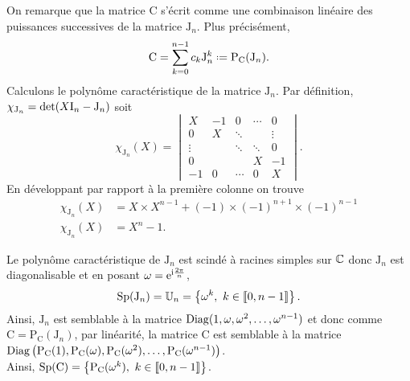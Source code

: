 \begin{preuve}
    On remarque que la matrice $\mathrm{C}$ s'écrit comme une combinaison linéaire des puissances successives de la matrice $\mathrm{J}_n$. Plus précisément, 
    $$\mathrm{C} = \sum_{k=0}^{n-1} c_k \mathrm{J}_n^k \defeq \mathrm{P}_{\mathrm{C}}(\mathrm{J}_n).$$
    Calculons le polynôme caractéristique de la matrice $\mathrm{J}_n$. Par définition, $\chi_{\mathrm{J}_n} = \det(X \mathrm{I}_n - \mathrm{J}_n)$ soit 
    $$
        \chi_{\mathrm{J}_n}(X) = 
        \begin{vmatrix}
        X & -1 & 0 & \cdots & 0 \\
        0 & X & \ddots & & \vdots \\
        \vdots & & \ddots & \ddots & 0 \\
        0 & & & X & -1 \\
        -1 & 0 & \cdots & 0 & X
        \end{vmatrix}.
    $$
    En développant par rapport à la première colonne on trouve
    \begin{align*}
        \chi_{\mathrm{J}_n}(X) &= X \times X^{n-1} + (-1) \times (-1)^{n+1} \times (-1)^{n-1} \\
        \chi_{\mathrm{J}_n}(X) &= X^n-1.
    \end{align*}
    
    Le polynôme caractéristique de $\mathrm{J}_n$ est scindé à racines simples sur $\mathbb{C}$ donc $\mathrm{J}_n$ est diagonalisable et en posant $\omega = \mathrm{e}^{\mathrm{i} \frac{2 \pi}{n}}$, 
    $$\mathrm{Sp}(\mathrm{J}_n) = \mathbb{U}_n = \left \{ \omega^k,\ k \in \llbracket 0, n-1 \rrbracket \right \}.$$
    Ainsi, $\mathrm{J}_n$ est semblable à la matrice $\mathrm{Diag}(1, \omega, \omega^2, \dots, \omega^{n-1})$ et donc comme $\mathrm{C} = \mathrm{P}_{\mathrm{C}}(\mathrm{J}_n)$, par linéarité, la matrice $\mathrm{C}$ est semblable à  la matrice $\mathrm{Diag} \left(\mathrm{P}_\mathrm{C}(1), \mathrm{P}_\mathrm{C}(\omega), \mathrm{P}_\mathrm{C}(\omega^2), \dots,\mathrm{P}_\mathrm{C}(\omega^{n-1}) \right)$. \\
    Ainsi, $\mathrm{Sp}(\mathrm{C}) = \left \{ \mathrm{P}_\mathrm{C}(\omega^k),\ k \in \llbracket 0, n-1 \rrbracket \right \}$.
\end{preuve}

